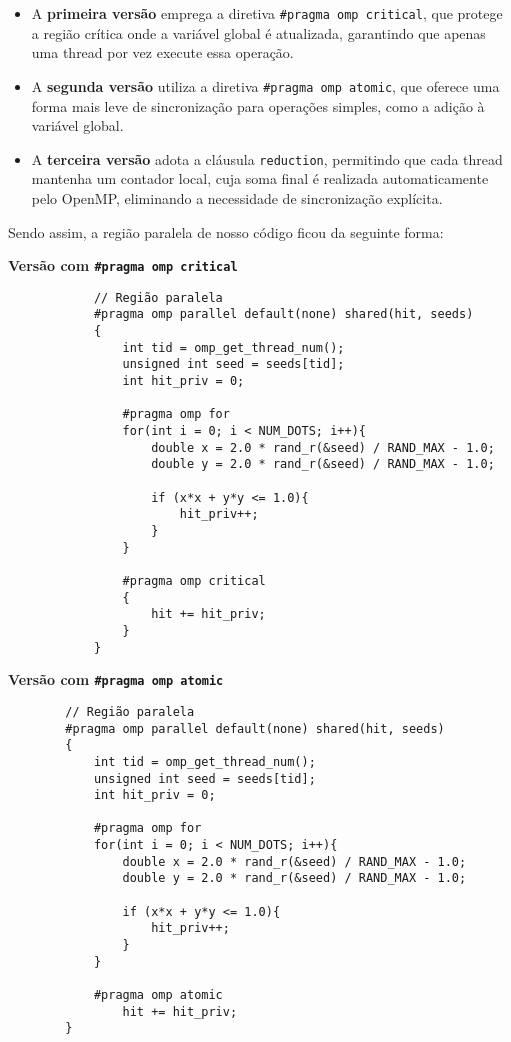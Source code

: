 \documentclass[a4paper, 12pt]{article}
\begin{document}
	\begin{itemize}
		\item A \textbf{primeira versão} emprega a diretiva \texttt{\#pragma omp critical}, que protege a região crítica onde a variável global é atualizada, garantindo que apenas uma thread por vez execute essa operação.
		
		\item A \textbf{segunda versão} utiliza a diretiva \texttt{\#pragma omp atomic}, que oferece uma forma mais leve de sincronização para operações simples, como a adição à variável global.
		
		\item A \textbf{terceira versão} adota a cláusula \texttt{reduction}, permitindo que cada thread mantenha um contador local, cuja soma final é realizada automaticamente pelo OpenMP, eliminando a necessidade de sincronização explícita.
	\end{itemize}
	
	Sendo assim, a região paralela de nosso código ficou da seguinte forma:
	
	\vspace{.5cm}
	
	\textbf{Versão com \texttt{\#pragma omp critical}}
	
	\begin{verbatim}
		    // Região paralela
		    #pragma omp parallel default(none) shared(hit, seeds)
		    {
		        int tid = omp_get_thread_num();
		        unsigned int seed = seeds[tid];
		        int hit_priv = 0; 
				
		        #pragma omp for
		        for(int i = 0; i < NUM_DOTS; i++){
		            double x = 2.0 * rand_r(&seed) / RAND_MAX - 1.0;
		            double y = 2.0 * rand_r(&seed) / RAND_MAX - 1.0;
					
		            if (x*x + y*y <= 1.0){
		                hit_priv++;
		            }
		        }
				
		        #pragma omp critical
		        {
		            hit += hit_priv;
		        }
		    }
	\end{verbatim}
	
	\vspace{5cm}
	
	\textbf{Versão com \texttt{\#pragma omp atomic}}
	
	\begin{verbatim}
		// Região paralela
		#pragma omp parallel default(none) shared(hit, seeds)
		{
			int tid = omp_get_thread_num();
			unsigned int seed = seeds[tid];
			int hit_priv = 0; 
			
			#pragma omp for
			for(int i = 0; i < NUM_DOTS; i++){
				double x = 2.0 * rand_r(&seed) / RAND_MAX - 1.0;
				double y = 2.0 * rand_r(&seed) / RAND_MAX - 1.0;
				
				if (x*x + y*y <= 1.0){
					hit_priv++;
				}
			}
			
			#pragma omp atomic
				hit += hit_priv;
		}
	\end{verbatim}
	
\end{document}
